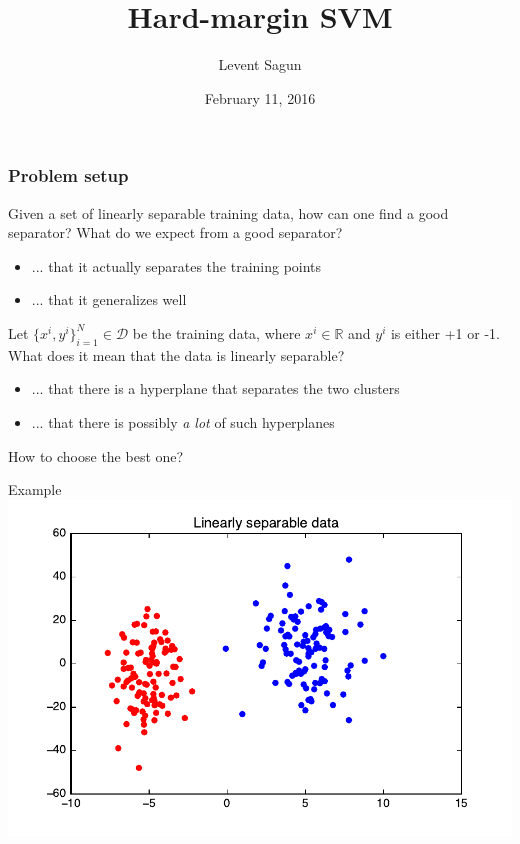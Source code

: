 \documentclass{beamer}
\title{Hard-margin SVM}
\author{Levent Sagun}
\institute{New York University}
\date{February 11, 2016}
\begin{document}

\frame{\titlepage}


\begin{frame}
\frametitle{Problem setup}

Given a set of linearly separable training data, how can one find a good separator? What do we expect from a good separator? 

\begin{itemize}
    \item<1-> ... that it actually separates the training points
    \item<1-> ... that it generalizes well
\end{itemize}

Let $\{x^i, y^i\}_{i=1}^N \in \mathcal{D} $ be the training data, where $x^i \in \mathbb{R}$ and $y^i$ is either +1 or -1. What does it mean that the data is linearly separable?

\begin{itemize}
    \item<1-> ... that there is a hyperplane that separates the two clusters
    \item<1-> ... that there is possibly \textit{a lot} of such hyperplanes
\end{itemize}

How to choose the best one?

\end{frame}
 

\begin{frame}{Example}
    \includegraphics[scale=0.7]{figures/SVM_data.pdf}
\end{frame}
\end{document}
